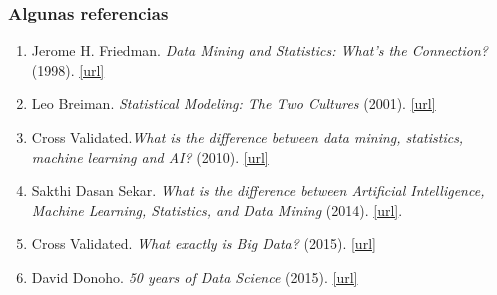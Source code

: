 \documentclass{beamer}
\begin{document}
\begin{frame}
\frametitle{Algunas referencias}
\begin{enumerate}
\item Jerome H. Friedman. \textit{Data Mining and Statistics: What's the Connection?} (1998). \href{http://statweb.stanford.edu/~jhf/ftp/dm-stat.pdf}{[url]}
\item Leo Breiman. \textit{Statistical Modeling: The Two Cultures} (2001). \href{http://projecteuclid.org/download/pdf_1/euclid.ss/1009213726}{[url]}
\item Cross Validated.\textit{What is the difference between data mining, statistics, machine learning and AI?} (2010). \href{http://stats.stackexchange.com/questions/5026/what-is-the-difference-between-data-mining-statistics-machine-learning-and-ai}{[url]}
\item Sakthi Dasan Sekar. \textit{What is the difference between Artificial Intelligence, Machine Learning, Statistics, and Data Mining} (2014). \href{http://shakthydoss.com/what-is-the-difference-between-artificial-intelligence-machine-learning-statistics-and-data-mining/}{[url]}.
\item Cross Validated. \textit{What exactly is Big Data?} (2015). \href{http://stats.stackexchange.com/questions/173060/what-exactly-is-big-data}{[url]}
\item David Donoho. \textit{50 years of Data Science} (2015). \href{http://pages.cs.wisc.edu/~anhai/courses/784-fall15/50YearsDataScience.pdf}{[url]}
\end{enumerate}
\end{frame}
\end{document}
